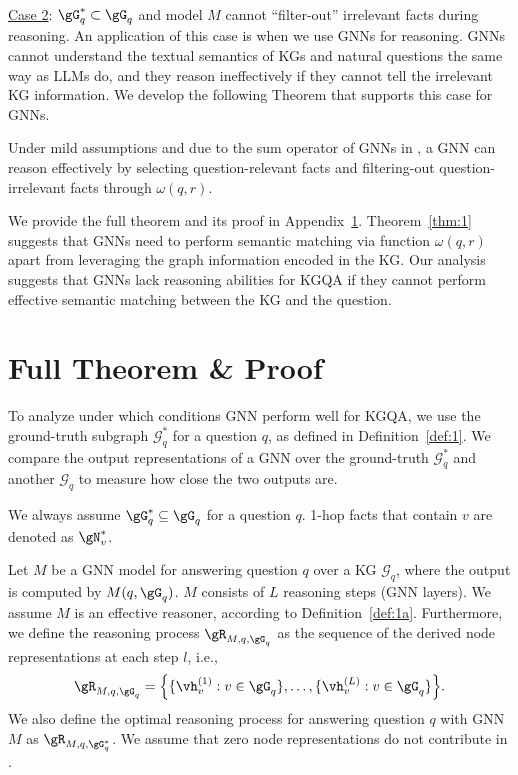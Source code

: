 \underline{Case 2}: $\gG_q^\ast  \subset \gG_q$ and model $M$ cannot “filter-out” irrelevant facts during reasoning. An application of this case is when we use GNNs for reasoning. GNNs cannot understand the textual semantics of KGs and natural questions the same way as LLMs do, and they reason ineffectively if they cannot tell the irrelevant KG information. We develop the following Theorem that supports this case for GNNs.

\begin{theorem}[Simplified]
\label{thm:1}
Under mild assumptions and due to the sum operator of GNNs in , a GNN can reason effectively  by selecting question-relevant facts and filtering-out question-irrelevant facts through $\omega(q, r)$. 
\end{theorem}
We provide the full theorem and its proof in Appendix~\ref{app:thm}. Theorem~\ref{thm:1} suggests that GNNs need to perform semantic matching via function
$\omega(q, r)$
apart from leveraging the graph information encoded in the KG. Our analysis suggests that  GNNs lack reasoning abilities for KGQA if they cannot perform effective semantic matching between the KG and the question. 
 

\section{Full Theorem \& Proof} \label{app:thm}

To analyze under which conditions GNN perform well for KGQA, we  use the ground-truth subgraph $\mathcal{G}_q^\ast$ for a question $q$, as defined in Definition~\ref{def:1}. We  compare the output representations of a GNN over the ground-truth $\mathcal{G}_q^\ast$ and another $\mathcal{G}_q$ to measure how close the two outputs are. 


We always assume $\gG_q^\ast \subseteq \gG_q$ for a question $q$. 1-hop facts that contain $v$ are denoted as $\gN_v^\ast$.


\begin{definition} \label{def:2}
Let $M$ be a GNN model for answering question $q$ over a KG $\mathcal{G}_q$, where the output is computed by $M(q,\gG_q)$. $M$ consists of $L$ reasoning steps (GNN layers).  We assume $M$ is an effective reasoner, according to Definition~\ref{def:1a}. Furthermore, we define the reasoning process $\gR_{M, q, \gG_q}$  as the sequence of the derived node representations at each step $l$, i.e.,  
\begin{equation}
    \gR_{M, q, \gG_q} = \Big\{ \{\vh_v^{(1)}: v \in \gG_q\}, \dots, \{\vh_v^{(L)}: v \in \gG_q\} \Big\}.
    \label{eq:resonproc}
\end{equation}
We also define the optimal reasoning process for answering question $q$ with GNN $M$ as $\gR_{M, q, \gG_q^\ast}$.
We assume that zero node representations do not contribute in . 
\end{definition}



